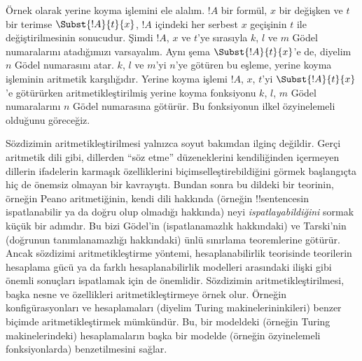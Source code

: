\documentclass[../../../include/open-logic-section]{subfiles}
\begin{document}
Örnek olarak yerine koyma işlemini ele alalım. $!A$ bir formül, $x$ bir
değişken ve $t$ bir terimse $\Subst{!A}{t}{x}$, $!A$ içindeki her serbest
$x$ geçişinin $t$ ile değiştirilmesinin sonucudur. Şimdi $!A$, $x$ ve $t$'ye
sırasıyla $k$, $l$ ve $m$ Gödel numaralarını atadığımızı varsayalım. Aynı
şema $\Subst{!A}{t}{x}$'e de, diyelim $n$ Gödel numarasını atar. $k$, $l$
ve $m$'yi $n$'ye götüren bu eşleme, yerine koyma işleminin aritmetik
karşılığıdır. Yerine koyma işlemi $!A$, $x$, $t$'yi
$\Subst{!A}{t}{x}$'e götürürken aritmetikleştirilmiş yerine koyma fonksiyonu
$k$, $l$, $m$ Gödel numaralarını $n$ Gödel numarasına götürür. Bu
fonksiyonun ilkel özyinelemeli olduğunu göreceğiz.

Sözdizimin aritmetikleştirilmesi yalnızca soyut bakımdan ilginç değildir.
Gerçi aritmetik dili gibi, dillerden ``söz etme'' düzeneklerini kendiliğinden
içermeyen dillerin ifadelerin karmaşık özelliklerini biçimselleştirebildiğini
görmek başlangıçta hiç de önemsiz olmayan bir kavrayıştı. Bundan sonra bu
dildeki bir teorinin, örneğin Peano aritmetiğinin, kendi dili hakkında
(örneğin !!{sentence}s{}in ispatlanabilir ya da doğru olup olmadığı hakkında)
neyi \emph{ispatlayabildiğini} sormak küçük bir adımdır. Bu bizi Gödel'in
(ispatlanamazlık hakkındaki) ve Tarski'nin (doğrunun tanımlanamazlığı
hakkındaki) ünlü sınırlama teoremlerine götürür. Ancak sözdizimi
aritmetikleştirme yöntemi, hesaplanabilirlik teorisinde teorilerin hesaplama
gücü ya da farklı hesaplanabilirlik modelleri arasındaki ilişki gibi önemli
sonuçları ispatlamak için de önemlidir. Sözdizimin aritmetikleştirilmesi,
başka nesne ve özellikleri aritmetikleştirmeye örnek olur. Örneğin
konfigürasyonları ve hesaplamaları (diyelim Turing makinelerininkileri) benzer
biçimde aritmetikleştirmek mümkündür. Bu, bir modeldeki (örneğin Turing
makinelerindeki) hesaplamaların başka bir modelde (örneğin özyinelemeli
fonksiyonlarda) benzetilmesini sağlar.
\end{document}
